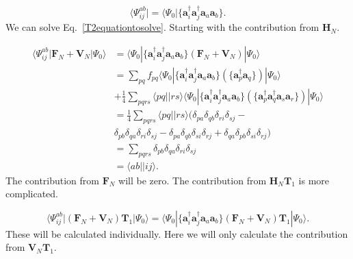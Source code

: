 \documentclass[graybox,sectrefs,envcountresetchap,open=right]{svmonodo}
\begin{document}
\begin{equation}
\langle \Psi_{ij}^{ab}| = \langle \Psi_0 | \{ \mathbf{a}^{\dagger}_i \mathbf{a}^{\dagger}_j \mathbf{a}_a \mathbf{a}_b \} .
\end{equation} 
We can solve Eq.~\ref{T2equationtosolve}. Starting with the contribution from $\mathbf{H}_N$. 

\begin{align}
\langle \Psi_{ij}^{ab} | \mathbf{F}_N + \mathbf{V}_N | \Psi_0 \rangle & = 
\langle \Psi_{0} | \{\mathbf{a}^{\dagger}_i \mathbf{a}^{\dagger}_j \mathbf{a}_a \mathbf{a}_b\} \left( \mathbf{F}_N + \mathbf{V}_N \right) | \Psi_0 \rangle \nonumber \\ &
= \sum_{pq} f_{pq} \langle \Psi_{0} | \{\mathbf{a}^{\dagger}_i \mathbf{a}^{\dagger}_j \mathbf{a}_a \mathbf{a}_b\} \left( \{ \mathbf{a}^{\dagger}_p \mathbf{a}_q \} \right) | \Psi_0 \rangle \nonumber \\ & 
+ \frac{1}{4} \sum_{pqrs} \langle pq || rs \rangle \langle \Psi_{0} | \{\mathbf{a}^{\dagger}_i \mathbf{a}^{\dagger}_j \mathbf{a}_a \mathbf{a}_b\} \left( \{ \mathbf{a}^{\dagger}_p \mathbf{a}^{\dagger}_q 
\mathbf{a}_s \mathbf{a}_r\} \right) | \Psi_0 \rangle \nonumber \\ &
= \frac{1}{4} \sum_{pqrs} \langle pq || rs \rangle
( \delta_{pa} \delta_{qb} \delta_{ri} \delta_{sj} - \nonumber \\ &
\delta_{pb} \delta_{qa} \delta_{ri} \delta_{sj} - 
\delta_{pa} \delta_{qb} \delta_{si} \delta_{rj} +
\delta_{qa} \delta_{pb} \delta_{si} \delta_{rj} ) \nonumber \\ &
= \sum_{pqrs} \delta_{pb} \delta_{qa} \delta_{ri} \delta_{sj} \nonumber \\ &
= \langle ab || ij \rangle .
\end{align} 
The contribution from $\mathbf{F}_N$ will be zero. The contribution from $\mathbf{H}_N \mathbf{T}_1$ is more complicated.

\begin{equation}
\langle \Psi_{ij}^{ab} | (\mathbf{F}_N + \mathbf{V}_N)\mathbf{T}_1 | \Psi_0 \rangle = \langle \Psi_{0} | \{\mathbf{a}^{\dagger}_i \mathbf{a}^{\dagger}_j \mathbf{a}_a \mathbf{a}_b\} \left( \mathbf{F}_N + \mathbf{V}_N \right) \mathbf{T}_1 | \Psi_0 \rangle .
\end{equation} 
These will be calculated individually. Here we will only calculate the contribution from $\mathbf{V}_N \mathbf{T}_1$.
\end{document}
